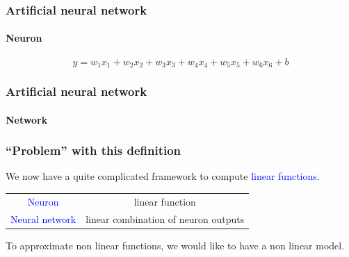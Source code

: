 \documentclass[9pt]{beamer}
\begin{document}
\begin{frame}
  \frametitle{Artificial neural network}

  \framesubtitle{Neuron}

  \begin{center}
    \scalebox{0.9}{
      
    }
  \end{center}

  \[
  y = w_{1}x_{1} + w_{2}x_{2} + w_{3}x_{3} + w_{4}x_{4} + w_{5}x_{5} + w_{6}x_{6} + b
  \]

\end{frame}

\begin{frame}
  \frametitle{Artificial neural network}

  \framesubtitle{Network}

  \begin{center}
    \scalebox{0.7}{
      
    }
  \end{center}
\end{frame}

\begin{frame}
  \frametitle{``Problem'' with this definition}

  We now have a quite complicated framework to compute
  \textcolor{blue}{linear functions}. 

  \bigskip

  \begin{center}
    \begin{tabular}{cc}
      \textcolor{blue}{Neuron} & linear function \\
      \textcolor{blue}{Neural network} & linear combination of neuron outputs \\
    \end{tabular}
  \end{center}

  \bigskip

  To approximate non linear functions, we would like to have a non
  linear model.

  \bigskip

\end{frame}
\end{document}
